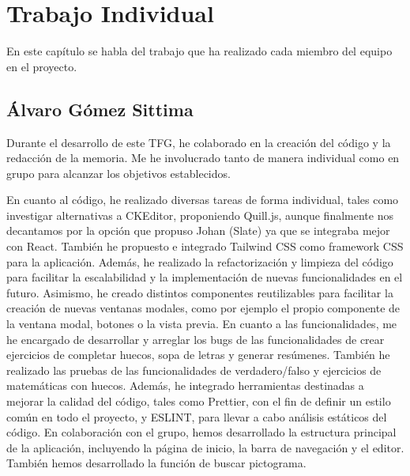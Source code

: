 \chapter{Trabajo Individual}
\label{cap:TrabajoIndividual}

En este capítulo se habla del trabajo que ha realizado cada miembro del equipo en el proyecto.

\section{Álvaro Gómez Sittima}
Durante el desarrollo de este TFG, he colaborado en la creación del código y la redacción de la memoria. Me he involucrado tanto de manera individual como en grupo para alcanzar los objetivos establecidos.

En cuanto al código, he realizado diversas tareas de forma individual, tales como investigar alternativas a CKEditor, proponiendo Quill.js, aunque finalmente nos decantamos por la opción que propuso Johan (Slate) ya que se integraba mejor con React. También he propuesto e integrado Tailwind CSS como framework CSS para la aplicación. Además, he realizado la refactorización y limpieza del código para facilitar la escalabilidad y la implementación de nuevas funcionalidades en el futuro. Asimismo, he creado distintos componentes reutilizables para facilitar la creación de nuevas ventanas modales, como por ejemplo el propio componente de la ventana modal, botones o la vista previa. En cuanto a las funcionalidades, me he encargado de desarrollar y arreglar los bugs de las funcionalidades de crear ejercicios de completar huecos, sopa de letras y generar resúmenes. También he realizado las pruebas de las funcionalidades de verdadero/falso y ejercicios de matemáticas con huecos. Además, he integrado herramientas destinadas a mejorar la calidad del código, tales como Prettier, con el fin de definir un estilo común en todo el proyecto, y ESLINT, para llevar a cabo análisis estáticos del código. En colaboración con el grupo, hemos desarrollado la estructura principal de la aplicación, incluyendo la página de inicio, la barra de navegación y el editor. También hemos desarrollado la función de buscar pictograma.

